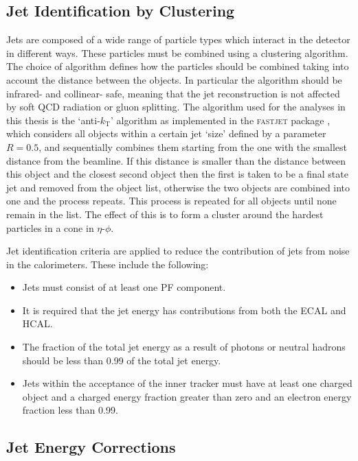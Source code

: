 \subsection{Jet Identification by Clustering}
\label{sec:jetID}

Jets are composed of a wide range of particle types which interact in the
detector in different ways. These particles must be combined using a clustering
algorithm. The choice of algorithm defines how the particles should be combined
taking into account the distance between the objects. In particular the
algorithm should be infrared- and collinear- safe, meaning that the jet
reconstruction is not affected by soft \ac{QCD} radiation or gluon splitting.
The algorithm used for the
analyses in this thesis is the `anti-$k_{\text{T}}$' algorithm as implemented in
the \textsc{fastjet} package \cite{Cacciari:fastjet1}, which considers all 
objects within a certain jet `size' defined by a parameter $R=0.5$, and 
sequentially combines them starting from the one with the
smallest distance from the beamline. If this distance is smaller than the
distance between this object and the closest second object then the first is
taken to be a final state jet and removed from the object list,
otherwise the two objects are combined into one and the process repeats. 
This process is repeated for all objects until none remain in the list. The effect of this
is to form a cluster around the hardest particles in a cone in $\eta$-$\phi$.

Jet identification criteria are applied to reduce the contribution of jets from
noise in the calorimeters. These include the following:
\begin{itemize}
\item Jets must consist of at least one \ac{PF} component. 
\item It is required that the jet energy has contributions
from both the \ac{ECAL} and \ac{HCAL}.
\item The fraction of the total jet energy as a result of photons or neutral
hadrons should be less than 0.99 of the total jet energy.
\item Jets within the acceptance of the inner tracker must have at least one
charged object and a charged energy fraction greater than zero and an electron
energy fraction less than 0.99. 
\end{itemize}

\subsection{Jet Energy Corrections}
\label{sec:JEC}

